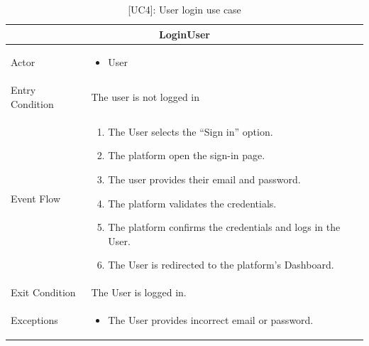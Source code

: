\begin{table}[H]
    \centering
    \begin{tabular}{|p{3cm}|p{12cm}|}
    \hline
    \multicolumn{2}{|c|}{\textbf{LoginUser}} \\ \hline
    Actor & 
    \begin{itemize}
        \item User
    \end{itemize}\\ \hline
    Entry Condition & The user is not logged in \\ \hline
    Event Flow &
    \begin{enumerate}         
        \item The User selects the “Sign in” option.
        \item The platform open the sign-in page.
        \item The user provides their email and password.
        \item The platform validates the credentials.
        \item The platform confirms the credentials and logs in the User.
        \item The User is redirected to the platform's Dashboard.
    \end{enumerate} \\ \hline
    Exit Condition & The User is logged in. \\ \hline
    Exceptions &
    \begin{itemize}
        \item The User provides incorrect email or password.
    \end{itemize} \\ \hline
    \end{tabular}
    \caption{[UC4]: User login use case}
    \label{tab:UC4}
\end{table}

